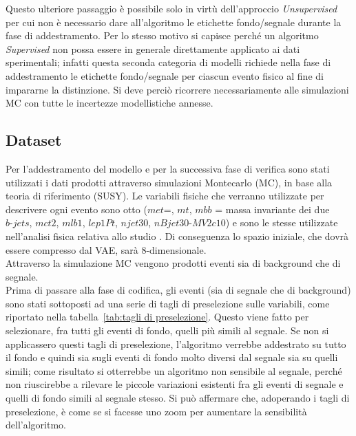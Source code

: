 Questo ulteriore passaggio è possibile solo in virtù dell'approccio \textit{Unsupervised} per cui non è necessario dare all'algoritmo le etichette fondo/segnale durante la fase di addestramento. Per lo stesso motivo si capisce perché un algoritmo \textit{Supervised} non possa essere in generale direttamente applicato ai dati sperimentali; infatti questa seconda categoria di modelli richiede nella fase di addestramento le etichette fondo/segnale per ciascun evento fisico al fine di impararne la distinzione. Si deve perciò ricorrere necessariamente alle simulazioni MC con tutte le incertezze modellistiche annesse. 


\newpage


\subsection{Dataset}
\label{dataset}
Per l'addestramento del modello e per la successiva fase di verifica sono stati utilizzati i dati prodotti attraverso simulazioni Montecarlo (MC), in base alla teoria di riferimento (SUSY). Le variabili fisiche che verranno utilizzate per descrivere ogni evento sono otto ($\textit{met}$=, $\textit{mt}$, $\textit{mbb}$ = massa invariante dei due $\textit{b-jets}$, $\textit{mct2}$, $\textit{mlb1}$, $\textit{lep1Pt}$, $\textit{njet30}$, $\textit{nBjet30-MV2c10}$) e sono le stesse utilizzate nell'analisi fisica relativa allo studio \cite{susy_alberto}. Di conseguenza lo spazio iniziale, che dovrà essere compresso dal VAE, sarà 8-dimensionale. \\
Attraverso la simulazione MC vengono prodotti eventi sia di background che di segnale.\\ 
Prima di passare alla fase di codifica, gli eventi (sia di segnale che di background) sono stati sottoposti ad una serie di tagli di preselezione sulle variabili, come riportato nella tabella~\ref{tab:tagli di preselezione}. Questo viene fatto per selezionare, fra tutti gli eventi di fondo, quelli più simili al segnale. Se non si applicassero questi tagli di preselezione, l'algoritmo verrebbe addestrato su tutto il fondo e quindi sia sugli eventi di fondo molto diversi dal segnale sia su quelli simili; come risultato si otterrebbe un algoritmo non sensibile al segnale, perché non riuscirebbe a rilevare le piccole variazioni esistenti fra gli eventi di segnale e quelli di fondo simili al segnale stesso. Si può affermare che, adoperando i tagli di preselezione, è come se si facesse uno zoom per aumentare la sensibilità dell'algoritmo. 

